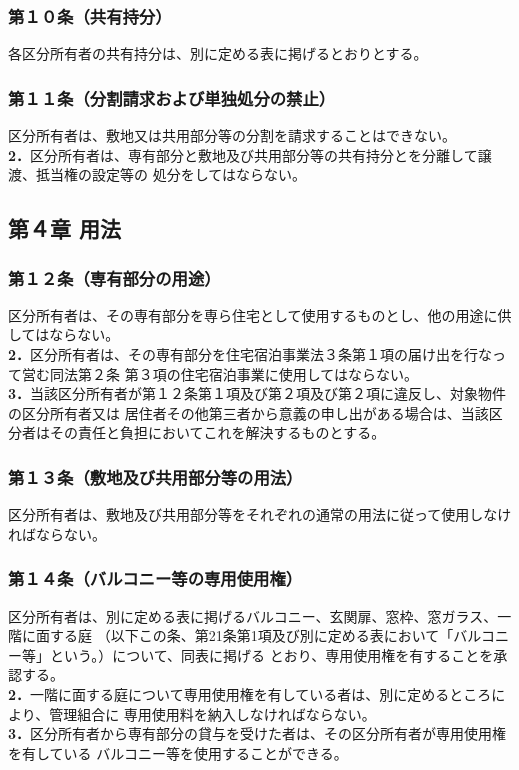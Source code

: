 \documentclass[12pt,uplatex,dvipdfmx]{jsarticle}
\begin{document}
\subsubsection*{第１０条（共有持分）}
各区分所有者の共有持分は、別に定める表に掲げるとおりとする。
\subsubsection*{第１１条（分割請求および単独処分の禁止）}
区分所有者は、敷地又は共用部分等の分割を請求することはできない。\\
\textbf{2．}区分所有者は、専有部分と敷地及び共用部分等の共有持分とを分離して譲渡、抵当権の設定等の
処分をしてはならない。

\begin{center}
\subsection*{第４章 用法}
\end{center}
\subsubsection*{第１２条（専有部分の用途）}
区分所有者は、その専有部分を専ら住宅として使用するものとし、他の用途に供してはならない。\\
\textbf{2．}区分所有者は、その専有部分を住宅宿泊事業法３条第１項の届け出を行なって営む同法第２条
第３項の住宅宿泊事業に使用してはならない。\\
\textbf{3．}当該区分所有者が第１２条第１項及び第２項及び第２項に違反し、対象物件の区分所有者又は
居住者その他第三者から意義の申し出がある場合は、当該区分者はその責任と負担においてこれを解決するものとする。
\subsubsection*{第１３条（敷地及び共用部分等の用法）}
区分所有者は、敷地及び共用部分等をそれぞれの通常の用法に従って使用しなければならない。
\subsubsection*{第１４条（バルコニー等の専用使用権）}
区分所有者は、別に定める表に掲げるバルコニー、玄関扉、窓枠、窓ガラス、一階に面する庭
（以下この条、第21条第1項及び別に定める表において「バルコニー等」という。）について、同表に掲げる
とおり、専用使用権を有することを承認する。\\
\textbf{2．}一階に面する庭について専用使用権を有している者は、別に定めるところにより、管理組合に
専用使用料を納入しなければならない。\\
\textbf{3．}区分所有者から専有部分の貸与を受けた者は、その区分所有者が専用使用権を有している
バルコニー等を使用することができる。
\end{document}
